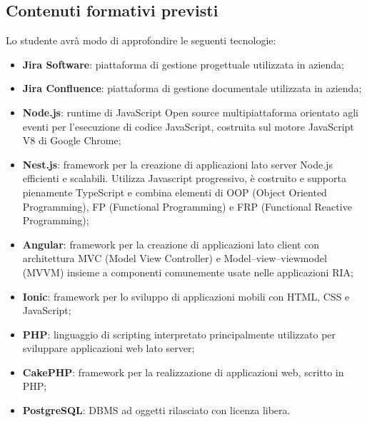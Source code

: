 \subsection{Contenuti formativi previsti}
Lo studente avrà modo di approfondire le seguenti tecnologie:
\begin{itemize}
	\item \textbf{Jira Software}: piattaforma di gestione progettuale utilizzata in azienda;
	\item \textbf{Jira Confluence}: piattaforma di gestione documentale utilizzata in azienda;
	\item \textbf{Node.js}: runtime di JavaScript Open source multipiattaforma orientato agli eventi per l’esecuzione di codice JavaScript, costruita sul motore JavaScript V8 di Google Chrome;
	\item \textbf{Nest.js}: framework per la creazione di applicazioni lato server Node.js efficienti e scalabili. Utilizza Javascript progressivo, è costruito e supporta pienamente TypeScript e combina elementi di OOP (Object Oriented Programming), FP (Functional Programming) e FRP (Functional Reactive Programming);
	\item \textbf{Angular}: framework per la creazione di applicazioni lato client con architettura MVC (Model View Controller) e Model–view–viewmodel (MVVM) insieme a componenti comunemente usate nelle applicazioni RIA;
	\item \textbf{Ionic}: framework per lo sviluppo di applicazioni mobili con HTML, CSS e JavaScript;
	\item \textbf{PHP}: linguaggio di scripting interpretato principalmente utilizzato per sviluppare applicazioni web lato server;
	\item \textbf{CakePHP}: framework per la realizzazione di applicazioni web, scritto in PHP;
	\item \textbf{PostgreSQL}: DBMS ad oggetti rilasciato con licenza libera.
\end{itemize}
\newpage